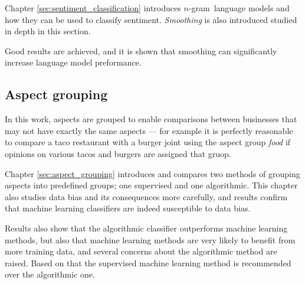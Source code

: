 \documentclass[a4paper,11pt]{kth-mag}
\newcommand{\ngram}{$n$-gram}
\begin{document}
Chapter \ref{sec:sentiment_classification} introduces \ngram~language models and how they can be used
to classify sentiment. \emph{Smoothing} is also introduced studied in depth in this section.

Good results are achieved, and it is shown that smoothing can significantly increase language
model preformance.

\subsection{Aspect grouping}
In this work, aspects are grouped to enable comparisons between businesses that may not have exactly the same aspects ---
for example it is perfectly reasonable to compare a taco restaurant with a burger joint using the aspect group \emph{food}
if opinions on various tacos and burgers are assigned that gruop.

Chapter \ref{sec:aspect_grouping} introduces and compares two methods of grouping aspects into predefined groups;
one supervised and one algorithmic. This chapter also studies data bias and its consequences more carefully,
and results confirm that machine learning classifiers are indeed susceptible to data bias.

Results also show that the algorithmic classifier outperforms machine learning methods,
but also that machine learning methods are very likely to benefit from more training data,
and several concerns about the algorithmic method are raised.
Based on that the supervised machine learning method is recommended over the algorithmic one.
\end{document}
